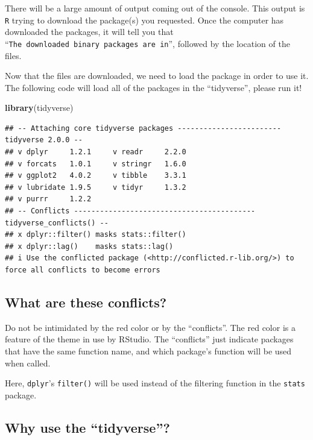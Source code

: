 \documentclass[
  10pt,
  letterpaper,
  twoside,
  openright]{book}
\newenvironment{Shaded}{\begin{snugshade}}{\end{snugshade}}
\newcommand{\FunctionTok}[1]{\textcolor[rgb]{0.13,0.29,0.53}{\textbf{#1}}}
\newcommand{\NormalTok}[1]{#1}
\begin{document}
There will be a large amount of output coming out of the console. This
output is \texttt{R} trying to download the package(s) you requested.
Once the computer has downloaded the packages, it will tell you that
``\texttt{The\ downloaded\ binary\ packages\ are\ in}'', followed by the
location of the files.

Now that the files are downloaded, we need to load the package in order
to use it. The following code will load all of the packages in the
``tidyverse'', please run it!

\begin{Shaded}
\begin{Highlighting}[]
\FunctionTok{library}\NormalTok{(tidyverse)}
\end{Highlighting}
\end{Shaded}

\begin{verbatim}
## -- Attaching core tidyverse packages ------------------------ tidyverse 2.0.0 --
## v dplyr     1.2.1     v readr     2.2.0
## v forcats   1.0.1     v stringr   1.6.0
## v ggplot2   4.0.2     v tibble    3.3.1
## v lubridate 1.9.5     v tidyr     1.3.2
## v purrr     1.2.2     
## -- Conflicts ------------------------------------------ tidyverse_conflicts() --
## x dplyr::filter() masks stats::filter()
## x dplyr::lag()    masks stats::lag()
## i Use the conflicted package (<http://conflicted.r-lib.org/>) to force all conflicts to become errors
\end{verbatim}

\hypertarget{what-are-these-conflicts}{%
\subsection{What are these conflicts?}\label{what-are-these-conflicts}}

Do not be intimidated by the red color or by the ``conflicts''. The red
color is a feature of the theme in use by RStudio. The ``conflicts''
just indicate packages that have the same function name, and which
package's function will be used when called.

Here, \texttt{dplyr}'s \texttt{filter()} will be used instead of the
filtering function in the \texttt{stats} package.

\hypertarget{why-use-the-tidyverse}{%
\subsection{Why use the ``tidyverse''?}\label{why-use-the-tidyverse}}
\end{document}
